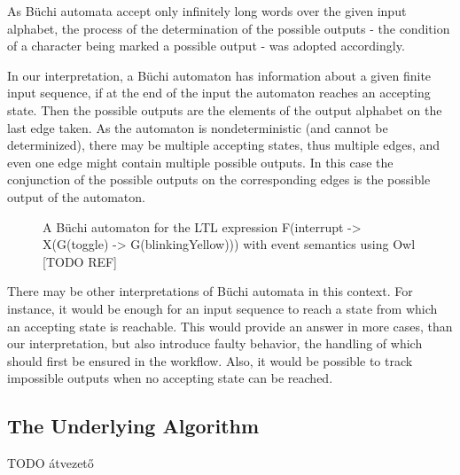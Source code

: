 As Büchi automata accept only infinitely long words over the given input alphabet, the process of the determination of the possible outputs - the condition of a character being marked a possible output - was adopted accordingly.

In our interpretation, a Büchi automaton has information about a given finite input sequence, if at the end of the input the automaton reaches an accepting state. Then the possible outputs are the elements of the output alphabet on the last edge taken. As the automaton is nondeterministic (and cannot be determinized), there may be multiple accepting states, thus multiple edges, and even one edge might contain multiple possible outputs. In this case the conjunction of the possible outputs on the corresponding edges is the possible output of the automaton.  

\begin{figure}[!ht] 
	\centering
	\caption{A Büchi automaton for the LTL expression F(interrupt -> X(G(toggle) -> G(blinkingYellow))) with event semantics using Owl [TODO REF]} 
	\label{fig_architecture_buchiexample}
\end{figure} %

There may be other interpretations of Büchi automata in this context. For instance, it would be enough for an input sequence to reach a state from which an accepting state is reachable. This would provide an answer in more cases, than our interpretation, but also introduce faulty behavior, the handling of which should first be ensured in the workflow. Also, it would be possible to track impossible outputs when no accepting state can be reached.

\subsection{The Underlying Algorithm} \label{subs_dhcintheframework}
TODO átvezető

